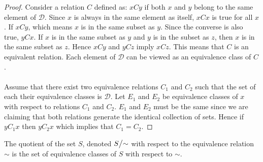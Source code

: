 \begin{proof}
  Consider a relation $C$ defined as: $xCy$ if both $x$ and $y$ belong to the same element of $\mathscr{D}$. Since $x$ is always in the same element as itself, $xCx$ is true for all $x$. If $xCy$, which means $x$ is in the same subset as $y$. Since the converse is also true, $yCx$. If $x$ is in the same subset as $y$ and $y$ is in the subset as $z$, then $x$ is in the same subset as $z$. Hence $xCy$ and $yCz$ imply $xCz$. This means that $C$ is an equivalent relation. Each element of $\mathscr{D}$ can be viewed as an equivalence class of $C$.
  \paragraph{} Assume that there exist two equivalence relations $C_1$ and $C_2$ such that the set of each their equivalence classes is $\mathscr{D}$. Let $E_1$ and $E_2$ be equivalence classes of $x$ with respect to relations $C_1$ and $C_2$. $E_1$ and $E_2$ must be the same since we are claiming that both relations generate the identical collection of sets. Hence if $yC_1x$ then $yC_2x$ which implies that $C_1 = C_2$.
\end{proof}
\begin{definition}
  The quotient of the set $S$, denoted $S\bign/\sim$ with respect to the equivalence relation $\sim$ is the set of equivalence classes of $S$ with respect to $\sim$.
\end{definition}
